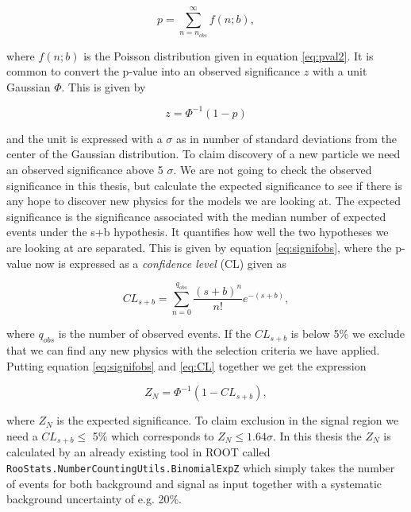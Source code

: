 \begin{equation}
    \label{eq:pvalues}
    p = \sum_{n=n_{obs}}^\infty f(n;b),
\end{equation}


where $f(n;b)$ is the Poisson distribution given in equation \ref{eq:pval2}. It is common to convert the p-value into an observed significance $z$ with a unit Gaussian $\Phi$. This is given by

\begin{equation}
    \label{eq:signifobs}
    z = \Phi^{-1}(1-p)
\end{equation}

 and the unit is expressed with a $\sigma$ as in number of standard deviations from the center of the Gaussian distribution. To claim discovery of a new particle we need an observed significance above 5 $\sigma$. We are not going to check the observed significance in this thesis, but calculate the expected significance to see if there is any hope to discover new physics for the models we are looking at. The expected significance is the significance associated with the median number of expected events under the s+b hypothesis. It quantifies how well the two hypotheses we are looking at are separated. This is given by equation \ref{eq:signifobs}, where the p-value now is expressed as a \textit{confidence level} (CL) given as
 
 \begin{equation}
    \label{eq:CL}
    CL_{s+b} = \sum_{n=0}^{q_{obs}} \frac{(s+b)^n}{n!} e^{-(s+b)},
 \end{equation}

where $q_{obs}$ is the number of observed events. If the $CL_{s+b}$ is below 5\% we exclude that we can find any new physics with the selection criteria we have applied. Putting equation \ref{eq:signifobs} and \ref{eq:CL} together we get the expression

\begin{equation}
    \label{eq:signif}
    Z_N = \Phi^{-1}(1-CL_{s+b}),
\end{equation}

where $Z_N$ is the expected significance. To claim exclusion in the signal region we need a $CL_{s+b} \leq$ 5\% which corresponds to $Z_N \leq 1.64 \sigma$. In this thesis the $Z_N$ is calculated by an already existing tool in ROOT called \texttt{RooStats.NumberCountingUtils.BinomialExpZ} which simply takes the number of events for both background and signal as input together with a systematic background uncertainty of e.g. 20\%.







